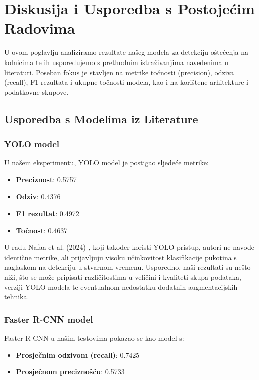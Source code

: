 \documentclass[conference]{IEEEtran}
\begin{document}

\section{Diskusija i Usporedba s Postojećim Radovima}
U ovom poglavlju analiziramo rezultate našeg modela za detekciju oštećenja na kolnicima te ih uspoređujemo s prethodnim istraživanjima navedenima u literaturi. Poseban fokus je stavljen na metrike točnosti (precision), odziva (recall), F1 rezultata i ukupne točnosti modela, kao i na korištene arhitekture i podatkovne skupove.

\subsection{Usporedba s Modelima iz Literature}

\subsubsection*{YOLO model}

U našem eksperimentu, YOLO model je postigao sljedeće metrike:
\begin{itemize}
    \item \textbf{Preciznost}: 0.5757
    \item \textbf{Odziv}: 0.4376
    \item \textbf{F1 rezultat}: 0.4972
    \item \textbf{Točnost}: 0.4637
\end{itemize}

U radu Nafaa et al. (2024) \cite{nafaa2024}, koji također koristi YOLO pristup, autori ne navode identične metrike, ali prijavljuju visoku učinkovitost klasifikacije pukotina s naglaskom na detekciju u stvarnom vremenu. Usporedno, naši rezultati su nešto niži, što se može pripisati različitostima u veličini i kvaliteti skupa podataka, verziji YOLO modela te eventualnom nedostatku dodatnih augmentacijskih tehnika.

\subsubsection*{Faster R-CNN model}

Faster R-CNN u našim testovima pokazao se kao model s:
\begin{itemize}
    \item \textbf{Prosječnim odzivom (recall)}: 0.7425
    \item \textbf{Prosječnom preciznošću}: 0.5733
\end{itemize}
\end{document}

